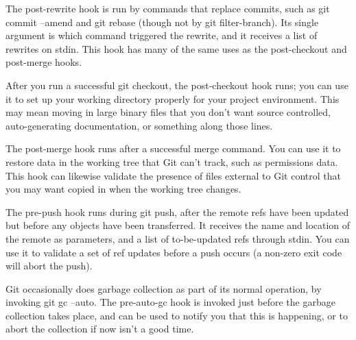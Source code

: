 The post-rewrite hook is run by commands that replace commits, such as git commit --amend and git rebase (though not by git filter-branch). Its single argument is which command triggered the rewrite, and it receives a list of rewrites on stdin. This hook has many of the same uses as the post-checkout and post-merge hooks.

After you run a successful git checkout, the post-checkout hook runs; you can use it to set up your working directory properly for your project environment. This may mean moving in large binary files that you don’t want source controlled, auto-generating documentation, or something along those lines.

The post-merge hook runs after a successful merge command. You can use it to restore data in the working tree that Git can’t track, such as permissions data. This hook can likewise validate the presence of files external to Git control that you may want copied in when the working tree changes.

The pre-push hook runs during git push, after the remote refs have been updated but before any objects have been transferred. It receives the name and location of the remote as parameters, and a list of to-be-updated refs through stdin. You can use it to validate a set of ref updates before a push occurs (a non-zero exit code will abort the push).

Git occasionally does garbage collection as part of its normal operation, by invoking git gc --auto. The pre-auto-gc hook is invoked just before the garbage collection takes place, and can be used to notify you that this is happening, or to abort the collection if now isn’t a good time.

